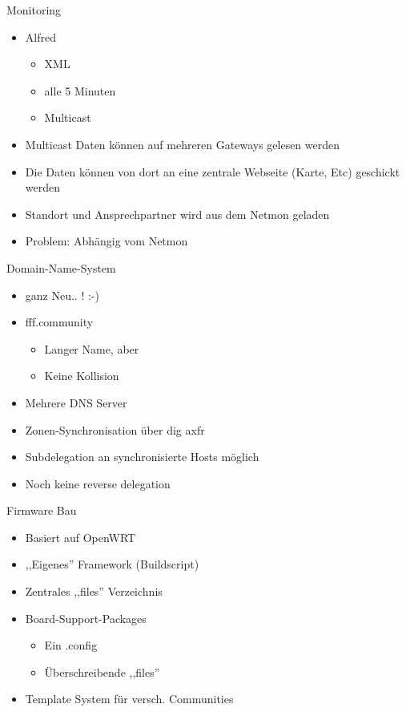 \begin{frame}{Monitoring}
    \begin{itemize}
        \item Alfred
        \begin{itemize}
            \item XML
            \item alle 5 Minuten
            \item Multicast
        \end{itemize}
        \item Multicast Daten können auf mehreren Gateways gelesen werden
        \item Die Daten können von dort an eine zentrale Webseite (Karte, Etc) geschickt werden
        \item Standort und Ansprechpartner wird aus dem Netmon geladen
        \item Problem: Abhängig vom Netmon
    \end{itemize}
\end{frame}

\begin{frame}{Domain-Name-System}
    \begin{itemize}
        \item ganz Neu.. ! :-)
        \item fff.community
        \begin{itemize}
            \item Langer Name, aber
            \item Keine Kollision
        \end{itemize}
        \item Mehrere DNS Server
        \item Zonen-Synchronisation über dig axfr
        \item Subdelegation an synchronisierte Hosts möglich
        \item Noch keine reverse delegation
    \end{itemize}
\end{frame}

\begin{frame}{Firmware Bau}
    \begin{itemize}
        \item Basiert auf OpenWRT
        \item ,,Eigenes'' Framework (Buildscript)
        \item Zentrales ,,files'' Verzeichnis
        \item Board-Support-Packages
        \begin{itemize}
            \item Ein .config
            \item Überschreibende ,,files''
        \end{itemize}
        \item Template System für versch. Communities
    \end{itemize}
\end{frame}

